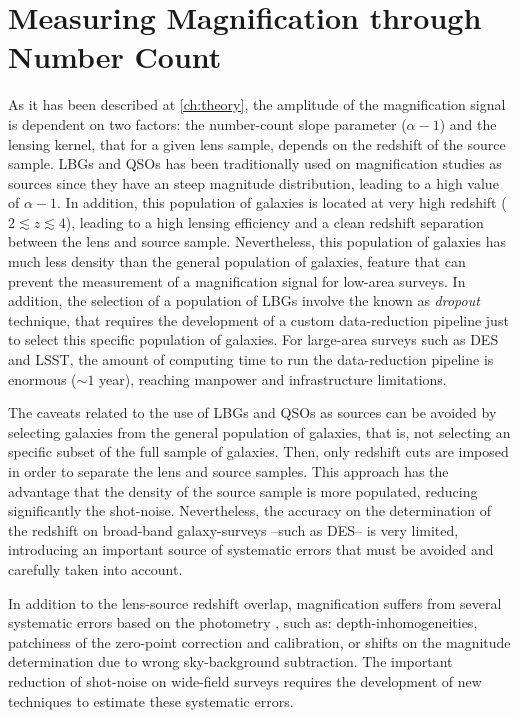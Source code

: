 \section{Measuring Magnification through Number Count}
\label{sec:method}
As it has been described at \autoref{ch:theory}, the amplitude of the magnification signal is dependent on two factors: the number-count slope parameter ($\alpha-1$) and the lensing kernel, that for a given lens sample, depends on the redshift of the source sample. LBGs and QSOs has been traditionally used on magnification studies as sources since they have an steep magnitude distribution, leading to a high value of $\alpha-1$. In addition, this population of galaxies is located at very high redshift ($2\lesssim z\lesssim 4$), leading to a high lensing efficiency and a clean redshift separation between the lens and source sample. Nevertheless, this population of galaxies has much less density than the general population of galaxies, feature that can prevent the measurement of a magnification signal for low-area surveys. In addition, the selection of a population of LBGs involve the known as {\it dropout} technique, that requires the development of a custom data-reduction pipeline just to select this specific population of galaxies. For large-area surveys such as DES and LSST, the amount of computing time to run the data-reduction pipeline is enormous ($\sim 1$ year), reaching manpower and infrastructure limitations.
\newline

The caveats related to the use of LBGs and QSOs as sources can be avoided by selecting galaxies from the general population of galaxies, that is, not selecting an specific subset of the full sample of galaxies. Then, only redshift cuts are imposed in order to separate the lens and source samples. This approach has the advantage that the density of the source sample is more populated, reducing significantly the shot-noise. Nevertheless, the accuracy on the determination of the redshift on broad-band galaxy-surveys --such as DES-- is very limited, introducing an important source of systematic errors that must be avoided and carefully taken into account.
\newline

In addition to the lens-source redshift overlap, magnification suffers from several systematic errors based on the photometry \cite{2015MNRAS.454.3121M,2016MNRAS.455.3943H}, such as: depth-inhomogeneities, patchiness of the zero-point correction and calibration, or shifts on the magnitude determination due to wrong sky-background subtraction. The important reduction of shot-noise on wide-field surveys requires the development of new techniques to estimate these systematic errors.
\newline

